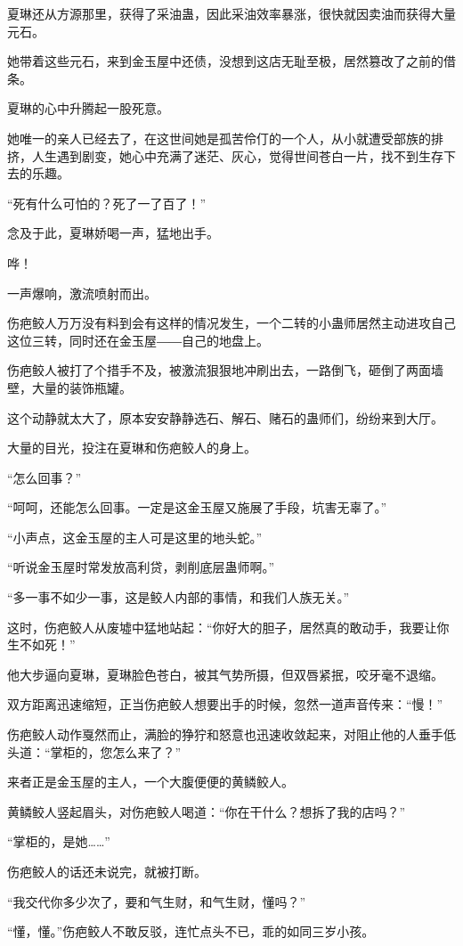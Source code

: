 \begin{this_body}
夏琳还从方源那里，获得了采油蛊，因此采油效率暴涨，很快就因卖油而获得大量元石。

她带着这些元石，来到金玉屋中还债，没想到这店无耻至极，居然篡改了之前的借条。

夏琳的心中升腾起一股死意。

她唯一的亲人已经去了，在这世间她是孤苦伶仃的一个人，从小就遭受部族的排挤，人生遇到剧变，她心中充满了迷茫、灰心，觉得世间苍白一片，找不到生存下去的乐趣。

“死有什么可怕的？死了一了百了！”

念及于此，夏琳娇喝一声，猛地出手。

哗！

一声爆响，激流喷射而出。

伤疤鲛人万万没有料到会有这样的情况发生，一个二转的小蛊师居然主动进攻自己这位三转，同时还在金玉屋――自己的地盘上。

伤疤鲛人被打了个措手不及，被激流狠狠地冲刷出去，一路倒飞，砸倒了两面墙壁，大量的装饰瓶罐。

这个动静就太大了，原本安安静静选石、解石、赌石的蛊师们，纷纷来到大厅。

大量的目光，投注在夏琳和伤疤鲛人的身上。

“怎么回事？”

“呵呵，还能怎么回事。一定是这金玉屋又施展了手段，坑害无辜了。”

“小声点，这金玉屋的主人可是这里的地头蛇。”

“听说金玉屋时常发放高利贷，剥削底层蛊师啊。”

“多一事不如少一事，这是鲛人内部的事情，和我们人族无关。”

这时，伤疤鲛人从废墟中猛地站起：“你好大的胆子，居然真的敢动手，我要让你生不如死！”

他大步逼向夏琳，夏琳脸色苍白，被其气势所摄，但双唇紧抿，咬牙毫不退缩。

双方距离迅速缩短，正当伤疤鲛人想要出手的时候，忽然一道声音传来：“慢！”

伤疤鲛人动作戛然而止，满脸的狰狞和怒意也迅速收敛起来，对阻止他的人垂手低头道：“掌柜的，您怎么来了？”

来者正是金玉屋的主人，一个大腹便便的黄鳞鲛人。

黄鳞鲛人竖起眉头，对伤疤鲛人喝道：“你在干什么？想拆了我的店吗？”

“掌柜的，是她……”

伤疤鲛人的话还未说完，就被打断。

“我交代你多少次了，要和气生财，和气生财，懂吗？”

“懂，懂。”伤疤鲛人不敢反驳，连忙点头不已，乖的如同三岁小孩。


\end{this_body}
